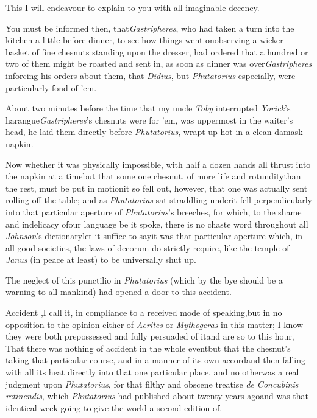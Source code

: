 \documentclass{article}
\begin{document}
This I will endeavour to explain to you with all imaginable
decency.

You must be informed then, that\break \textit{Gastripheres}, who had
taken a turn into the kitchen a little before dinner, to see how
things went on\tsk observing a wicker-\pb
basket of fine chesnuts
standing upon the dresser, had ordered that a hundred or two of
them might be roasted and sent in, as soon as dinner was
over\tsk \textit{Gastri\-pheres} inforcing his orders about
them, that \textit{Didius}, but \textit{Phutatorius} especially, were
particularly fond of ’em.

About two minutes before the time that my uncle \textit{Toby}
interrupted \textit{Yorick}’s
harangue\tsk \textit{Gastripheres}’s chesnuts were  for ’em,
was uppermost in the waiter’s head, he laid them directly
before \textit{Phutatorius}, wrapt up hot in a clean damask
napkin.

Now whether it was physically impossible, with half a dozen
hands all thrust into the napkin at a time\tsk but that some one
chesnut, of more life and rotundity\pb than the rest, must be put in
motion\tsk it so fell out, however, that one was\break
actually sent rolling off the table; and\break
as \textit{Phutatorius} sat straddling
under\tsk it fell perpendicularly into that particular
aperture of \textit{Phutatorius}’s breeches, for which, to the
shame and indelicacy of\break our language be it spoke, there is no
chaste word throughout all \textit{Johnson}’s
dictionary\tsk let it suffice to say\tsk it was
that particular aperture which, in all good societies, the laws of
decorum do strictly require, like the temple of \textit{Janus} (in
peace at least) to be universally shut up.

The neglect of this punctilio in \textit{Phutatorius} (which
by the bye should be a warning to all mankind) had opened a door to
this accident.\tsh

\newpage
Accident ,I call it, in compliance to a received mode of
speaking,\tsh but in no opposition to the opinion either of
\textit{Acrites} or \textit{Mythogeras} in this matter; I know they
were both prepossessed and fully persuaded of it\tsk and are so
to this hour, That there was nothing of accident in the whole
event\tsh but that the chesnut’s taking that particular course, and
in a manner of its own accord\tsk and then falling with all its
heat directly into that one particular place, and no
other\tsh was a real judgment upon \textit{Phutatorius}, for
that filthy and obscene treatise \textit{de Concubinis retinendis},
which \textit{Phutatorius} had published about twenty years
ago\tsh and was that identical week going to give the
world a second edition of.
\end{document}
